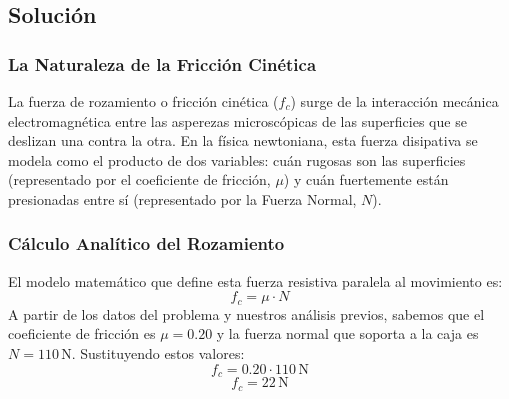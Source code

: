 \documentclass[12pt]{article}
\begin{document}
\begin{center}
\end{center}

\subsection*{Solución}

\subsubsection*{La Naturaleza de la Fricción Cinética}
La fuerza de rozamiento o fricción cinética ($f_c$) surge de la interacción mecánica electromagnética entre las asperezas microscópicas de las superficies que se deslizan una contra la otra. En la física newtoniana, esta fuerza disipativa se modela como el producto de dos variables: cuán rugosas son las superficies (representado por el coeficiente de fricción, $\mu$) y cuán fuertemente están presionadas entre sí (representado por la Fuerza Normal, $N$).

\subsubsection*{Cálculo Analítico del Rozamiento}
El modelo matemático que define esta fuerza resistiva paralela al movimiento es:
\begin{equation}
    f_c = \mu \cdot N
\end{equation}
A partir de los datos del problema y nuestros análisis previos, sabemos que el coeficiente de fricción es $\mu = 0.20$ y la fuerza normal que soporta a la caja es $N = 110 \, \text{N}$. Sustituyendo estos valores:
\begin{equation}
    f_c = 0.20 \cdot 110 \, \text{N}
\end{equation}
\begin{equation}
    f_c = 22 \, \text{N}
\end{equation}
\end{document}
